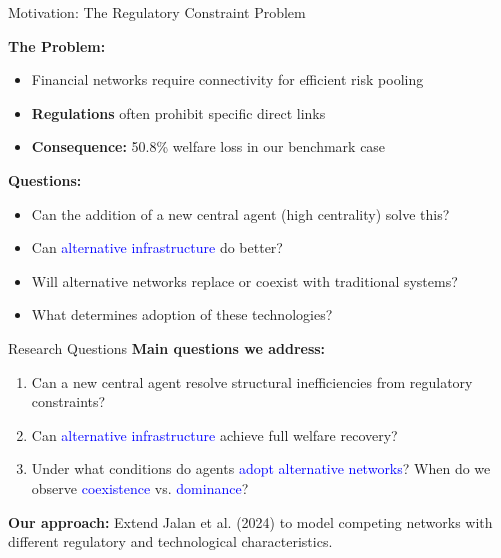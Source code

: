 \documentclass[aspectratio=169]{beamer}
\begin{document}
\begin{frame}{Motivation: The Regulatory Constraint Problem}
    
    \textbf{The Problem:}
    \begin{itemize}
        \item Financial networks require connectivity for efficient risk pooling
        \item \textbf{Regulations} often prohibit specific direct links
        \item \textbf{Consequence:} 50.8\% welfare loss in our benchmark case
    \end{itemize}
    
    \vspace{0.5cm}
    \textbf{Questions:}
    \begin{itemize}
        \item Can the addition of a new central agent (high centrality) solve this?
        \item Can \textcolor{blue}{alternative infrastructure} do better?
        \item Will alternative networks replace or coexist with traditional systems?
        \item What determines adoption of these technologies?
    \end{itemize}

\end{frame}

\begin{frame}{Research Questions}
\textbf{Main questions we address:}
\begin{enumerate}
    \item Can a new central agent resolve structural inefficiencies from regulatory constraints?
    \item Can \textcolor{blue}{alternative infrastructure} achieve full welfare recovery?
    \item Under what conditions do agents \textcolor{blue}{adopt alternative networks}? When do we observe \textcolor{blue}{coexistence} vs. \textcolor{blue}{dominance}?
\end{enumerate}

\vspace{0.5cm}
\textbf{Our approach:} Extend Jalan et al. (2024) to model competing networks with different regulatory and technological characteristics.
\end{frame}

\end{document}
